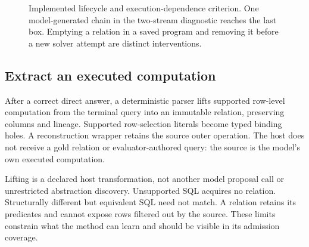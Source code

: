 \documentclass[10pt,twocolumn]{article}
\begin{document}
\begin{figure}[t]
\centering
{}
\caption{Implemented lifecycle and execution-dependence criterion. One
model-generated chain in the two-stream diagnostic reaches the last box.
Emptying a relation in a saved program and removing it before a new solver
attempt are distinct interventions.}\label{fig:loop}
\end{figure}

\subsection{Extract an executed computation}
After a correct direct answer, a deterministic parser lifts supported row-level
computation from the terminal query into an immutable relation, preserving
columns and lineage. Supported row-selection literals become typed binding
holes. A reconstruction wrapper retains the source outer operation. The host
does not receive a gold relation or evaluator-authored query: the source is the
model's own executed computation.

Lifting is a declared host transformation, not another model proposal call or
unrestricted abstraction discovery. Unsupported SQL acquires no relation.
Structurally different but equivalent SQL need not match. A relation retains
its predicates and cannot expose rows filtered out by the source. These limits
constrain what the method can learn and should be visible in its admission
coverage.
\end{document}
